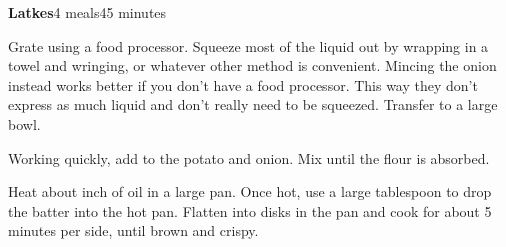 \documentclass[../Cookbook.tex]{subfiles}
\begin{document}
\begin{recipe}[Latke]{\textbf{Latkes}}{4 meals}{45 minutes}

Grate using a food processor. Squeeze most of the liquid out by wrapping in a towel and wringing, or whatever other method is convenient.
Mincing the onion instead works better if you don't have a food processor. This way they don't express as much liquid and don't really need to be squeezed.
Transfer to a large bowl.

Working quickly, add to the potato and onion. Mix until the flour is absorbed.

Heat about  inch of oil in a large pan. Once hot, use a large tablespoon to drop the batter into the hot pan. Flatten into disks in the pan and cook for about 5 minutes per side, until brown and crispy.

\end{recipe}
\end{document}
